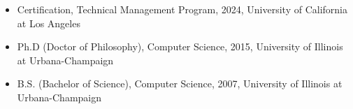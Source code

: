 \begin{itemize}%
\item Certification, Technical Management Program, 2024, University of California at Los Angeles 
    \item Ph.D (Doctor of Philosophy), Computer Science, 2015, University of Illinois at Urbana-Champaign
   \item B.S. (Bachelor of Science), Computer Science, 2007, University of Illinois at Urbana-Champaign
\end{itemize}